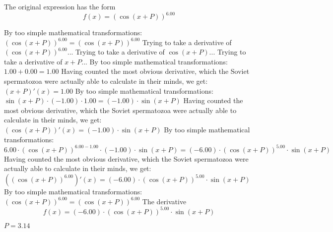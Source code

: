 \documentclass{article}
\begin{document}
                          
The original expression has the form \[f(x) = {\left( \cos {\left({{x} + {P}}\right)} \right) ^ {6.00}} \]

By too simple mathematical transformations:
 ${\left( \cos {\left({{x} + {P}}\right)} \right) ^ {6.00}} = {\left( \cos {\left({{x} + {P}}\right)} \right) ^ {6.00}}$ 
 \newline
 \newline 
Trying to take a derivative of ${\left( \cos {\left({{x} + {P}}\right)} \right) ^ {6.00}}$...\newline
\newline
Trying to take a derivative of $ \cos {\left({{x} + {P}}\right)} $...\newline
\newline
Trying to take a derivative of ${{x} + {P}}$...\newline
\newline
By too simple mathematical transformations:
 ${{1.00} + {0.00}} = {1.00}$ 
 \newline
 \newline 
Having counted the most obvious derivative, which the Soviet spermatozoa were actually able to calculate in their minds, we get:
$({{x} + {P}})'(x) = {1.00}$\newline
\newline
By too simple mathematical transformations:
 ${{ \sin {\left({{x} + {P}}\right)}  \cdot \left({-1.00}\right)} \cdot {1.00}} = {\left({-1.00}\right) \cdot  \sin {\left({{x} + {P}}\right)} }$ 
 \newline
 \newline 
Having counted the most obvious derivative, which the Soviet spermatozoa were actually able to calculate in their minds, we get:
$( \cos {\left({{x} + {P}}\right)} )'(x) = {\left({-1.00}\right) \cdot  \sin {\left({{x} + {P}}\right)} }$\newline
\newline
By too simple mathematical transformations:
 ${{{6.00} \cdot {\left( \cos {\left({{x} + {P}}\right)} \right) ^ {{6.00} - {1.00}}}} \cdot {\left({-1.00}\right) \cdot  \sin {\left({{x} + {P}}\right)} }} = {\left({-6.00}\right) \cdot {{\left( \cos {\left({{x} + {P}}\right)} \right) ^ {5.00}} \cdot  \sin {\left({{x} + {P}}\right)} }}$ 
 \newline
 \newline 
Having counted the most obvious derivative, which the Soviet spermatozoa were actually able to calculate in their minds, we get:
$({\left( \cos {\left({{x} + {P}}\right)} \right) ^ {6.00}})'(x) = {\left({-6.00}\right) \cdot {{\left( \cos {\left({{x} + {P}}\right)} \right) ^ {5.00}} \cdot  \sin {\left({{x} + {P}}\right)} }}$\newline
\newline
By too simple mathematical transformations:
 ${\left( \cos {\left({{x} + {P}}\right)} \right) ^ {6.00}} = {\left( \cos {\left({{x} + {P}}\right)} \right) ^ {6.00}}$ 
 \newline
 \newline 
The derivative \[f(x) = {\left({-6.00}\right) \cdot {{\left( \cos {\left({{x} + {P}}\right)} \right) ^ {5.00}} \cdot  \sin {\left({{x} + {P}}\right)} }} \]

$P = {3.14}$
\newline\newline
\newline
\end{document}
